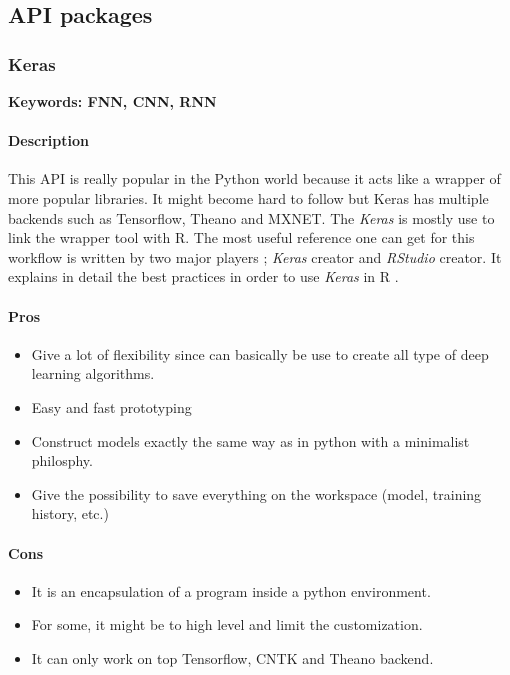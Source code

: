 \documentclass[6pt,letter]{article}\usepackage[]{graphicx}\usepackage[]{color}
\begin{document}
\subsection{API packages}

\subsubsection{Keras}
\textbf{Keywords: FNN, CNN, RNN}
\paragraph{Description}
This API is really popular in the Python world because it acts like a wrapper of more popular libraries. It might become hard to follow but Keras has multiple backends such as Tensorflow, Theano and MXNET. The \textit{Keras} \cite{keras2019} is mostly use to link the wrapper tool with R. The most useful reference one can get for this workflow is written by two major players ; \textit{Keras} creator and \textit{RStudio} creator. It explains in detail the best practices in order to use \textit{Keras} in R \cite{chollet2018deep}.

\paragraph{Pros}
\begin{itemize}
\item Give a lot of flexibility since can basically be use to create all type of deep learning algorithms.
\item Easy and fast prototyping
\item Construct models exactly the same way as in python with a minimalist philosphy.
\item Give the possibility to save everything on the workspace (model, training history, etc.)
\end{itemize}
\paragraph{Cons}
\begin{itemize}
\item It is an encapsulation of a program inside a python environment.
\item For some, it might be to high level and limit the customization.
\item It can only work on top Tensorflow, CNTK and Theano backend.
\end{itemize}
\end{document}

